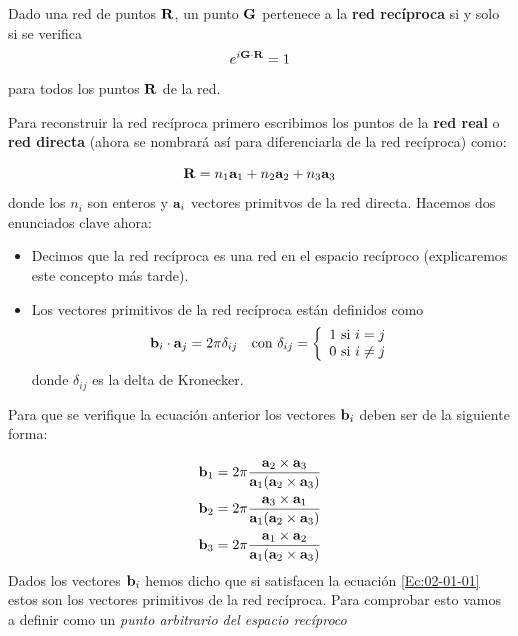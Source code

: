 \begin{definition}
	Dado una red de puntos $\mathbf{R}$, un punto $\mathbf{G}$ pertenece a la \textbf{red recíproca} si y solo si se verifica 	
	\begin{equation}
		e^{i \mathbf{G} \cdot \mathbf{R}} = 1 \label{Ec:02-01-01}
	\end{equation}
	para todos los puntos $\mathbf{R}$ de la red.
\end{definition}
Para reconstruir la red recíproca primero escribimos los puntos de la \textbf{red real} o \textbf{red directa} (ahora se nombrará así para diferenciarla de la red recíproca) como:

\begin{equation}
	\mathbf{R} = n_1 \mathbf{a}_1 + n_2\mathbf{a}_2 + n_3 \mathbf{a}_3
\end{equation}
donde los $n_i$ son enteros y $\mathbf{a}_i$ vectores primitvos de la red directa. Hacemos dos enunciados clave ahora:

\begin{itemize}
	\item Decimos que la red recíproca es una red en el espacio recíproco (explicaremos este concepto más tarde). 
	\item Los vectores primitivos de la red recíproca están definidos como
	\begin{equation}
		\bn_i \cdot \an_j = 2 \pi \delta_{ij}  \quad \text{con} \ \delta_{ij} = \left\lbrace \begin{array}{l}
			1 \ \text{si} \ i = j \\
			0 \ \text{si} \ i \neq j
		\end{array} \right. %
	\end{equation}
	donde $\delta_{ij}$ es la delta de Kronecker.
\end{itemize}
Para que se verifique la ecuación anterior los vectores $\mathbf{b}_i$ deben ser de la siguiente forma:

\begin{equation}
	\begin{split}    
		\mathbf{b}_1 & = 2 \pi \frac{\mathbf{a}_2 \times \mathbf{a}_3}{\mathbf{a}_1 (\mathbf{a}_2 \times \mathbf{a}_3)} \\
		\mathbf{b}_2 & = 2 \pi \frac{\mathbf{a}_3 \times \mathbf{a}_1}{\mathbf{a}_1 (\mathbf{a}_2 \times \mathbf{a}_3)}  \\
		\mathbf{b}_3 & = 2 \pi \frac{\mathbf{a}_1 \times \mathbf{a}_2}{\mathbf{a}_1 (\mathbf{a}_2 \times \mathbf{a}_3)}
	\end{split} \label{Ec:02-01-04}
\end{equation}
Dados los vectores $\mathbf{b}_i$ hemos dicho que si satisfacen la ecuación \ref{Ec:02-01-01} estos son los vectores primitivos de la red recíproca. Para comprobar esto vamos a definir como un \textit{punto arbitrario del espacio recíproco}

